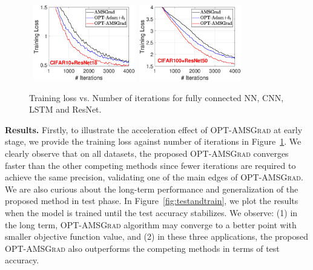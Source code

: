 \documentclass[twoside]{article}
\begin{document}
\begin{figure}[t]
\mbox{\hspace{-0.15in}
\includegraphics[width=1.75in]{simulation/fig2/cifar10_resnet_train_loss.eps}\hspace{-0.1in}
\includegraphics[width=1.75in]{simulation/fig2/cifar100_resnet_train_loss.eps}
}
\caption{Training loss vs. Number of iterations for fully connected NN, CNN, LSTM and ResNet.}
\label{fig:train_loss}\vspace{-0.15in}
\end{figure}

\textbf{Results.} 
Firstly, to illustrate the acceleration effect of \textsc{OPT-AMSGrad} at early stage, we provide the training loss against number of iterations in Figure~\ref{fig:train_loss}. 
We clearly observe that on all datasets, the proposed \textsc{OPT-AMSGrad} converges faster than the other competing methods since fewer iterations are required to achieve the same precision, validating one of the main edges of \textsc{OPT-AMSGrad}.
We are also curious about the long-term performance and generalization of the proposed method in test phase.
In Figure~\ref{fig:testandtrain}, we plot the results when the model is trained until the test accuracy stabilizes. 
We observe: \textsf{(1)} in the long term, \textsc{OPT-AMSGrad} algorithm may converge to a better point with smaller objective function value, and \textsf{(2)} in these three applications, the proposed \textsc{OPT-AMSGrad} also outperforms the competing methods in terms of test accuracy. \vspace{-0.1in}
\end{document}

